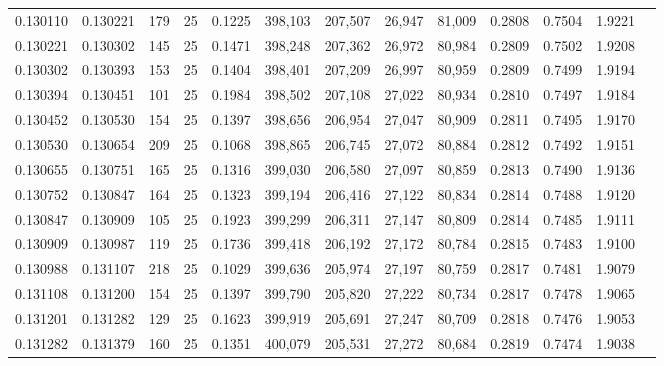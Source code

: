 \begin{tabular}{rrrrrrrrrrrrr}
0.130110 & 0.130221 &   179 &  25 &                                     0.1225 & 398,103 & 207,507 &  26,947 &  81,009 & 0.2808 & 0.7504 & 1.9221 \\
0.130221 & 0.130302 &   145 &  25 &                                     0.1471 & 398,248 & 207,362 &  26,972 &  80,984 & 0.2809 & 0.7502 & 1.9208 \\
0.130302 & 0.130393 &   153 &  25 &                                     0.1404 & 398,401 & 207,209 &  26,997 &  80,959 & 0.2809 & 0.7499 & 1.9194 \\
0.130394 & 0.130451 &   101 &  25 &                                     0.1984 & 398,502 & 207,108 &  27,022 &  80,934 & 0.2810 & 0.7497 & 1.9184 \\
0.130452 & 0.130530 &   154 &  25 &                                     0.1397 & 398,656 & 206,954 &  27,047 &  80,909 & 0.2811 & 0.7495 & 1.9170 \\
0.130530 & 0.130654 &   209 &  25 &                                     0.1068 & 398,865 & 206,745 &  27,072 &  80,884 & 0.2812 & 0.7492 & 1.9151 \\
0.130655 & 0.130751 &   165 &  25 &                                     0.1316 & 399,030 & 206,580 &  27,097 &  80,859 & 0.2813 & 0.7490 & 1.9136 \\
0.130752 & 0.130847 &   164 &  25 &                                     0.1323 & 399,194 & 206,416 &  27,122 &  80,834 & 0.2814 & 0.7488 & 1.9120 \\
0.130847 & 0.130909 &   105 &  25 &                                     0.1923 & 399,299 & 206,311 &  27,147 &  80,809 & 0.2814 & 0.7485 & 1.9111 \\
0.130909 & 0.130987 &   119 &  25 &                                     0.1736 & 399,418 & 206,192 &  27,172 &  80,784 & 0.2815 & 0.7483 & 1.9100 \\
0.130988 & 0.131107 &   218 &  25 &                                     0.1029 & 399,636 & 205,974 &  27,197 &  80,759 & 0.2817 & 0.7481 & 1.9079 \\
0.131108 & 0.131200 &   154 &  25 &                                     0.1397 & 399,790 & 205,820 &  27,222 &  80,734 & 0.2817 & 0.7478 & 1.9065 \\
0.131201 & 0.131282 &   129 &  25 &                                     0.1623 & 399,919 & 205,691 &  27,247 &  80,709 & 0.2818 & 0.7476 & 1.9053 \\
0.131282 & 0.131379 &   160 &  25 &                                     0.1351 & 400,079 & 205,531 &  27,272 &  80,684 & 0.2819 & 0.7474 & 1.9038 \\

\end{tabular}
